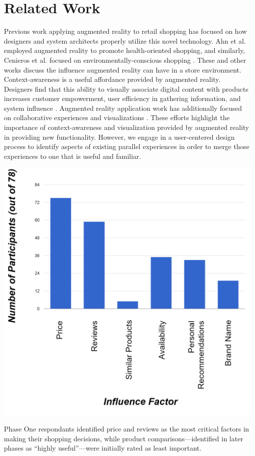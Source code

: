\section{Related Work}

Previous work applying augmented reality to retail shopping has focused on how designers and system architects properly utilize this novel technology. Ahn et al. employed augmented reality to promote health-oriented shopping\cite{ahn2015supporting}, and similarly, Cenieros et al. focused on environmentally-conscious shopping \cite{ceniceros2014augmented}. These and other works \cite{esser2016head,stoyanova2015comparison} discuss the influence augmented reality can have in a store environment. Context-awareness is a useful affordance provided by augmented reality.  Designers find that this ability to visually associate digital content with products increases customer empowerment, user efficiency in gathering information, and system influence \cite{kourouthanassis2007enhancing,olsson2013expected,zhu2004personalized}. Augmented reality application work has additionally focused on collaborative experiences and visualizations \cite{esser2016head,santos2016augmented,stoyanova2015comparison,truong2013today}. These efforts highlight the importance of context-awareness and visualization provided by augmented reality in providing new functionality. However, we engage in a user-centered design process to identify aspects of existing parallel experiences in order to merge those experiences to one that is useful and familiar.

\begin{marginfigure}
	\begin{minipage}{\marginparwidth}
		\includegraphics[width=0.9\columnwidth]{figures/ShoppingFactors}
		\caption{Phase One respondants identified price and reviews as the most critical factors in making their shopping decisions, while product comparisons---identified in later phases as ``highly useful''---were initially rated as least important.}
		\label{figures:ShoppingFactors}
	\end{minipage}
\end{marginfigure}

